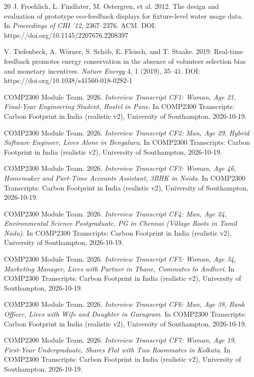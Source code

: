 \documentclass[12pt, a4paper]{article}
\begin{document}
\begin{thebibliography}{20}
J. Froehlich, L. Findlater, M. Ostergren, et al. 2012. The design and evaluation of prototype eco-feedback displays for fixture-level water usage data. In \textit{Proceedings of CHI '12}, 2367--2376. ACM. DOI: https://doi.org/10.1145/2207676.2208397

V. Tiefenbeck, A. Wörner, S. Schöb, E. Fleisch, and T. Staake. 2019. Real-time feedback promotes energy conservation in the absence of volunteer selection bias and monetary incentives. \textit{Nature Energy} 4, 1 (2019), 35--41. DOI: https://doi.org/10.1038/s41560-018-0282-1

COMP2300 Module Team. 2026. \textit{Interview Transcript CF1: Woman, Age 21, Final-Year Engineering Student, Hostel in Pune}. In COMP2300 Transcripts: Carbon Footprint in India (realistic v2), University of Southampton, 2026-10-19.

COMP2300 Module Team. 2026. \textit{Interview Transcript CF2: Man, Age 29, Hybrid Software Engineer, Lives Alone in Bengaluru}. In COMP2300 Transcripts: Carbon Footprint in India (realistic v2), University of Southampton, 2026-10-19.

COMP2300 Module Team. 2026. \textit{Interview Transcript CF3: Woman, Age 46, Homemaker and Part-Time Accounts Assistant, 3BHK in Noida}. In COMP2300 Transcripts: Carbon Footprint in India (realistic v2), University of Southampton, 2026-10-19.

COMP2300 Module Team. 2026. \textit{Interview Transcript CF4: Man, Age 24, Environmental Science Postgraduate, PG in Chennai (Village Roots in Tamil Nadu)}. In COMP2300 Transcripts: Carbon Footprint in India (realistic v2), University of Southampton, 2026-10-19.

COMP2300 Module Team. 2026. \textit{Interview Transcript CF5: Woman, Age 34, Marketing Manager, Lives with Partner in Thane, Commutes to Andheri}. In COMP2300 Transcripts: Carbon Footprint in India (realistic v2), University of Southampton, 2026-10-19.

COMP2300 Module Team. 2026. \textit{Interview Transcript CF6: Man, Age 38, Bank Officer, Lives with Wife and Daughter in Gurugram}. In COMP2300 Transcripts: Carbon Footprint in India (realistic v2), University of Southampton, 2026-10-19.

COMP2300 Module Team. 2026. \textit{Interview Transcript CF7: Woman, Age 19, First-Year Undergraduate, Shares Flat with Two Roommates in Kolkata}. In COMP2300 Transcripts: Carbon Footprint in India (realistic v2), University of Southampton, 2026-10-19.


\end{thebibliography}
\end{document}
